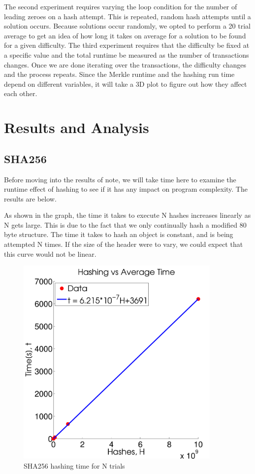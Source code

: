 \documentclass[pdftex,11pt]{article}
\begin{document}
The second experiment requires varying the loop condition for the number of leading zeroes on a hash attempt. This is repeated, random hash attempts until a solution occurs. Because solutions occur randomly, we opted to perform a 20 trial average to get an idea of how long it takes on average for a solution to be found for a given difficulty. 
The third experiment requires that the difficulty be fixed at a specific value and the total runtime be measured as the number of transactions changes. Once we are done iterating over the transactions, the difficulty changes and the process repeats. Since the Merkle runtime and the hashing run time depend on different variables, it will take a 3D plot to figure out how they affect each other. 

\section{Results and Analysis}
\subsection{SHA256}
Before moving into the results of note, we will take time here to examine the runtime effect of hashing to see if it has any impact on program complexity. The results are below.

As shown in the graph, the time it takes to execute N hashes increases linearly as N gets large. This is due to the fact that  we only continually hash a modified 80 byte structure. The time it takes to hash an object is constant, and is being attempted N times. If the size of the header were to vary, we could expect that this curve would not be linear.

\begin{figure}[H]
	\centering
	\includegraphics[width=100mm]{figures/SHA256.pdf}
	\caption{SHA256 hashing time for N trials}
	\label{sha256}
\end{figure}
\end{document}
